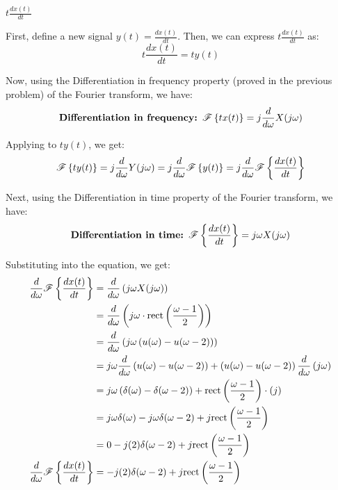 \documentclass[a4paper, 10pt]{article}
\begin{document}
\newpage

\begin{tosubmit}
\begin{subproblems}[start=3]
    \item \( t \frac{d x(t)}{dt} \)
\end{subproblems}

\par\noindent\submitsolution
First, define a new signal \( y(t) = \frac{d x(t)}{dt} \). Then, we can express \( t \frac{d x(t)}{dt} \) as:
\[
    t \frac{d x(t)}{dt} = t y(t)
\]

Now, using the Differentiation in frequency property (proved in the previous problem) of the Fourier transform, we have:
\[
    \textbf{Differentiation in frequency: } \mathscr{F} \left\{ t x(t) \right\} = j \frac{d}{d\omega} X(j\omega)
\]

Applying to \( t y(t) \), we get:
\[
    \mathscr{F} \left\{ t y(t) \right\} = j \frac{d}{d\omega} Y(j\omega) = j \frac{d}{d\omega} \mathscr{F} \left\{ y(t) \right\} = j \frac{d}{d\omega} \mathscr{F} \left\{ \frac{d x(t)}{dt} \right\}
\]

Next, using the Differentiation in time property of the Fourier transform, we have:
\[
    \textbf{Differentiation in time: } \mathscr{F} \left\{ \frac{d x(t)}{dt} \right\} = j\omega X(j\omega)
\]

Substituting into the equation, we get:
\begin{align*}  
    \frac{d}{d\omega} \mathscr{F} \left\{ \frac{d x(t)}{dt} \right\} &= \frac{d}{d\omega} \left( j\omega X(j\omega) \right) \\
    &= \frac{d}{d\omega} \left( j\omega \cdot \textrm{rect} \left( \frac{\omega - 1}{2} \right) \right) \\
    &= \frac{d}{d\omega} \left( j\omega \left( u(\omega) - u(\omega - 2) \right) \right) \\
    &= j\omega \frac{d}{d\omega} \left( u(\omega) - u(\omega - 2) \right) + \left( u(\omega) - u(\omega - 2) \right) \frac{d}{d\omega} \left( j\omega \right) \\
    &= j\omega \left( \delta(\omega) - \delta(\omega - 2) \right) + \textrm{rect} \left( \frac{\omega - 1}{2} \right) \cdot (j) \\
    &= j\omega \delta(\omega) - j\omega \delta(\omega - 2) + j \textrm{rect} \left( \frac{\omega - 1}{2} \right) \\
    &= 0 - j(2) \delta(\omega - 2) + j \textrm{rect} \left( \frac{\omega - 1}{2} \right) \\
    \frac{d}{d\omega} \mathscr{F} \left\{ \frac{d x(t)}{dt} \right\} &= - j(2) \delta(\omega - 2) + j \textrm{rect} \left( \frac{\omega - 1}{2} \right)
\end{align*}


\end{tosubmit}
\end{document}
